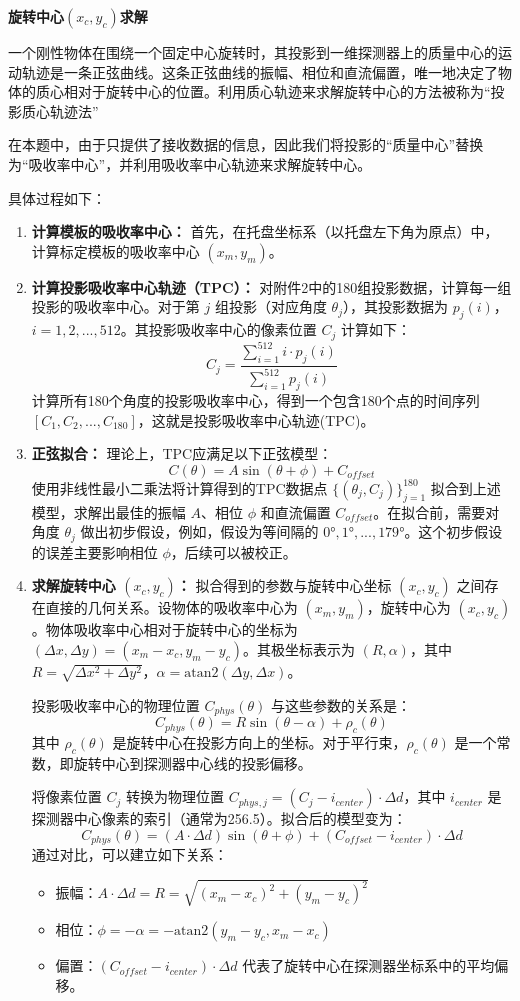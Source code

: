 \textbf{旋转中心$(x_c,y_c)$求解}
\par
一个刚性物体在围绕一个固定中心旋转时，其投影到一维探测器上的质量中心的运动轨迹是一条正弦曲线。这条正弦曲线的振幅、相位和直流偏置，唯一地决定了物体的质心相对于旋转中心的位置。利用质心轨迹来求解旋转中心的方法被称为“投影质心轨迹法”\par
在本题中，由于只提供了接收数据的信息，因此我们将投影的“质量中心”替换为“吸收率中心”，并利用吸收率中心轨迹来求解旋转中心。\par
具体过程如下：
\begin{enumerate}
    \item \textbf{计算模板的吸收率中心：} 首先，在托盘坐标系（以托盘左下角为原点）中，计算标定模板的吸收率中心 $(x_m,y_m)$。
    \item \textbf{计算投影吸收率中心轨迹（TPC）：} 对附件2中的180组投影数据，计算每一组投影的吸收率中心。对于第 $j$ 组投影（对应角度 $\theta_j$），其投影数据为 $p_j(i)$，$i=1,2,...,512$。其投影吸收率中心的像素位置 $C_j$ 计算如下：
       $$C_j=\frac{\sum_{i=1}^{512}i\cdot p_j(i)}{\sum_{i=1}^{512}p_j(i)}$$
       计算所有180个角度的投影吸收率中心，得到一个包含180个点的时间序列 $[C_1,C_2,...,C_{180}]$，这就是投影吸收率中心轨迹(TPC)。
    \item \textbf{正弦拟合：} 理论上，TPC应满足以下正弦模型：
       $$C(\theta)=A\sin(\theta+\phi)+C_{offset}$$
       使用非线性最小二乘法将计算得到的TPC数据点 $\{(\theta_j,C_j)\}_{j=1}^{180}$ 拟合到上述模型，求解出最佳的振幅 $A$、相位 $\phi$ 和直流偏置 $C_{offset}$。在拟合前，需要对角度 $\theta_j$ 做出初步假设，例如，假设为等间隔的 $0°,1°,...,179°$。这个初步假设的误差主要影响相位 $\phi$，后续可以被校正。
    \item \textbf{求解旋转中心 $(x_c,y_c)$：} 拟合得到的参数与旋转中心坐标 $(x_c,y_c)$ 之间存在直接的几何关系。设物体的吸收率中心为 $(x_m,y_m)$，旋转中心为 $(x_c,y_c)$。物体吸收率中心相对于旋转中心的坐标为 $(\Delta x,\Delta y)=(x_m-x_c,y_m-y_c)$。其极坐标表示为 $(R,\alpha)$，其中 $R=\sqrt{\Delta x^2+\Delta y^2}$，$\alpha=\text{atan2}(\Delta y,\Delta x)$。
       
       投影吸收率中心的物理位置 $C_{phys}(\theta)$ 与这些参数的关系是：
       $$C_{phys}(\theta)=R\sin(\theta-\alpha)+\rho_c(\theta)$$
       其中 $\rho_c(\theta)$ 是旋转中心在投影方向上的坐标。对于平行束，$\rho_c(\theta)$ 是一个常数，即旋转中心到探测器中心线的投影偏移。
       
       将像素位置 $C_j$ 转换为物理位置 $C_{phys,j}=(C_j-i_{center})\cdot\Delta d$，其中 $i_{center}$ 是探测器中心像素的索引（通常为256.5）。拟合后的模型变为：
       $$C_{phys}(\theta)=(A\cdot\Delta d)\sin(\theta+\phi)+(C_{offset}-i_{center})\cdot\Delta d$$
       通过对比，可以建立如下关系：
       \begin{itemize}
           \item 振幅：$A\cdot\Delta d=R=\sqrt{(x_m-x_c)^2+(y_m-y_c)^2}$
           \item 相位：$\phi=-\alpha=-\text{atan2}(y_m-y_c,x_m-x_c)$
           \item 偏置：$(C_{offset}-i_{center})\cdot\Delta d$ 代表了旋转中心在探测器坐标系中的平均偏移。
       \end{itemize}
\end{enumerate}

